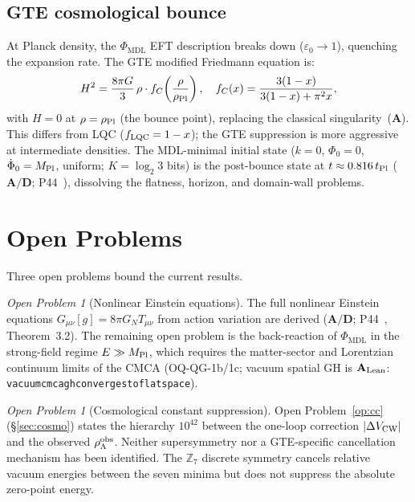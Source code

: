\documentclass[11pt]{article}
\theoremstyle{remark}
\newtheorem{openprob}[theorem]{Open Problem}
\newcommand{\PHIMDL}{\Phi_{\mathrm{MDL}}}
\newcommand{\ZS}{\mathbb{Z}_7}
\newcommand{\lean}[1]{%
  \penalty-100
  \begingroup\def\_{\textunderscore\allowbreak}\texttt{#1}\endgroup}
\newcommand{\CatA}{\textbf{A}}
\newcommand{\CatAL}{\ensuremath{\textbf{A}_{\rm Lean}}}
\newcommand{\CatAD}{\textbf{A/D}}
\newcommand{\Tmunu}{T_{\mu\nu}}
\newcommand{\GN}{G_N}
\newcommand{\rhoLam}{\rho_\Lambda}
\begin{document}
\subsection{GTE cosmological bounce}
\label{ssec:bounce}

At Planck density, the $\PHIMDL$ EFT description breaks down ($\varepsilon_0\to1$),
quenching the expansion rate.  The GTE modified Friedmann equation is:
\begin{equation}
  H^2 = \frac{8\pi G}{3}\,\rho\cdot f_C\!\left(\frac{\rho}{\rho_{\rm Pl}}\right),
  \quad
  f_C(x) = \frac{3(1-x)}{3(1-x)+\pi^2 x},
\end{equation}
with $H=0$ at $\rho=\rho_{\rm Pl}$ (the bounce point), replacing the classical
singularity~($\CatA$).  This differs from LQC ($f_{\rm LQC} = 1-x$); the GTE
suppression is more aggressive at intermediate densities.
The MDL-minimal initial state ($k=0$, $\Phi_0=0$, $\dot\Phi_0=M_{\rm Pl}$, uniform;
$K=\log_2 3$ bits) is the post-bounce state at $t\approx0.816\,t_{\rm Pl}$ ($\CatAD$;
P44~\cite{SpivackQGR}), dissolving the flatness, horizon, and domain-wall problems.

\section{Open Problems}
\label{sec:open}

Three open problems bound the current results.

\begin{openprob}[Nonlinear Einstein equations]
\label{op:nonlinear}
The full nonlinear Einstein equations $G_{\mu\nu}[g] = 8\pi\GN\Tmunu$ from action variation are derived ($\CatAD$; P44~\cite{SpivackQGR}, Theorem~3.2). The remaining open problem is the back-reaction of $\PHIMDL$ in the strong-field regime $E \gg M_{\rm Pl}$, which requires the matter-sector and Lorentzian continuum limits of the CMCA (OQ-QG-1b/1c; vacuum spatial GH is \CatAL: \lean{vacuum\_cmca\_gh\_converges\_to\_flat\_space}).
\end{openprob}

\begin{openprob}[Cosmological constant suppression]
\label{op:lambda}
Open Problem~\ref{op:cc} (\S\ref{sec:cosmo}) states the hierarchy $10^{42}$ between
the one-loop correction $|\Delta V_{\rm CW}|$ and the observed $\rhoLam^{\rm obs}$.
Neither supersymmetry nor a GTE-specific cancellation mechanism has been identified.
The $\ZS$ discrete symmetry cancels relative vacuum energies between the seven minima
but does not suppress the absolute zero-point energy.
\end{openprob}
\end{document}
